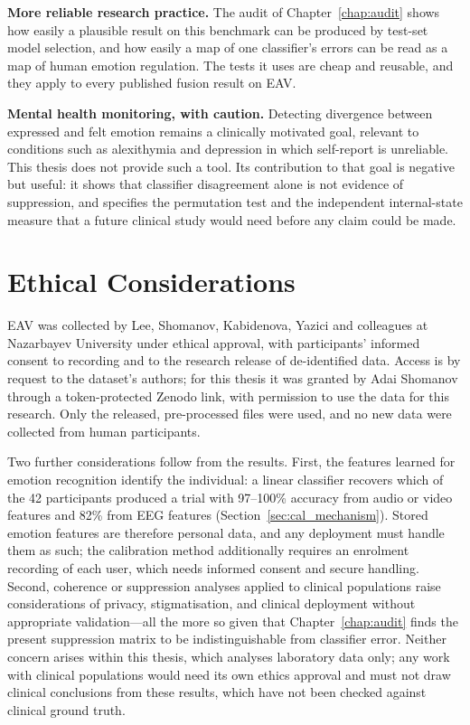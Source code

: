 \textbf{More reliable research practice.} The audit of Chapter~\ref{chap:audit} shows how easily a plausible result on this benchmark can be produced by test-set model selection, and how easily a map of one classifier's errors can be read as a map of human emotion regulation. The tests it uses are cheap and reusable, and they apply to every published fusion result on EAV.

\textbf{Mental health monitoring, with caution.} Detecting divergence between expressed and felt emotion remains a clinically motivated goal, relevant to conditions such as alexithymia and depression in which self-report is unreliable. This thesis does not provide such a tool. Its contribution to that goal is negative but useful: it shows that classifier disagreement alone is not evidence of suppression, and specifies the permutation test and the independent internal-state measure that a future clinical study would need before any claim could be made.

\section{Ethical Considerations}
EAV was collected by Lee, Shomanov, Kabidenova, Yazici and colleagues at Nazarbayev University under ethical approval, with participants' informed consent to recording and to the research release of de-identified data. Access is by request to the dataset's authors; for this thesis it was granted by Adai Shomanov through a token-protected Zenodo link, with permission to use the data for this research. Only the released, pre-processed files were used, and no new data were collected from human participants.

Two further considerations follow from the results. First, the features learned for emotion recognition identify the individual: a linear classifier recovers which of the 42 participants produced a trial with 97--100\% accuracy from audio or video features and 82\% from EEG features (Section~\ref{sec:cal_mechanism}). Stored emotion features are therefore personal data, and any deployment must handle them as such; the calibration method additionally requires an enrolment recording of each user, which needs informed consent and secure handling. Second, coherence or suppression analyses applied to clinical populations raise considerations of privacy, stigmatisation, and clinical deployment without appropriate validation---all the more so given that Chapter~\ref{chap:audit} finds the present suppression matrix to be indistinguishable from classifier error. Neither concern arises within this thesis, which analyses laboratory data only; any work with clinical populations would need its own ethics approval and must not draw clinical conclusions from these results, which have not been checked against clinical ground truth.
